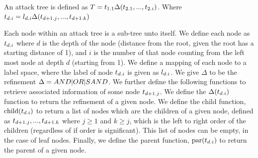 \begin{definition} \label{def:attack-tree} An attack tree  is defined as $T = t_{{1}.{1}}\Delta(t_{{2}.{1}},...,t_{{2}.{i}})$. Where $t_{{d}.{i}} = l_{{d}.{i}}\Delta(t_{{d+1}.{j}},...,t_{{d+1}.{k}})$




    Each node within an attack tree is a sub-tree unto itself. We define each node as $t_{{d}.{i}}$ where $d$ is the depth of the node (distance from the root, given the root has a starting distance of 1), and $i$ is the number of that node counting from the left most node at depth $d$ (starting from 1). We define a mapping of each node to a label space, where the label of node $t_{{d}.{i}}$ is given as $l_{{d}.{i}}$. We give $\Delta$ to be the refinement $\Delta = AND|OR|SAND$. We further define the following functions to retrieve associated information of some node $t_{{d+1}.{j}}$. We define the $\Delta(t_{{d}.{i}})$ function to return the refinement of a given node. We define the child function, $\text{child}({t_{{d}.{i}}})$ to return a list of nodes which are the children of a given node, defined as $t_{{d+1}.{j}},...,t_{{d+1}.{k}}$ where $j \ge 1$ and $k \ge j$, which is the left to right order of the children (regardless of if order is significant). This list of nodes can be empty, in the case of leaf nodes. Finally, we define the parent function, $\text{par}({t_{{d}.{i}}})$ to return the parent of a given node.
\end{definition}

